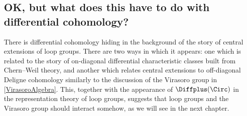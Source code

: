 %
%
%
%
%

\subsection{OK, but what does this have to do with differential cohomology?}
\label{PS_diffcoh}
There is differential cohomology hiding in the background of the story of central extensions of loop groups. There
are two ways in which it appears: one which is related to the story of on-diagonal differential characteristic
classes built from Chern--Weil theory, and another which relates central extensions to off-diagonal Deligne
cohomology similarly to the discussion of the Virasoro group in \cref{VirasoroAlgebra}. This, together with the
appearance of $\Diffplus(\Circ)$ in the representation theory of loop groups, suggests that loop groups and the
Virasoro group should interact somehow, as we will see in the next chapter.

